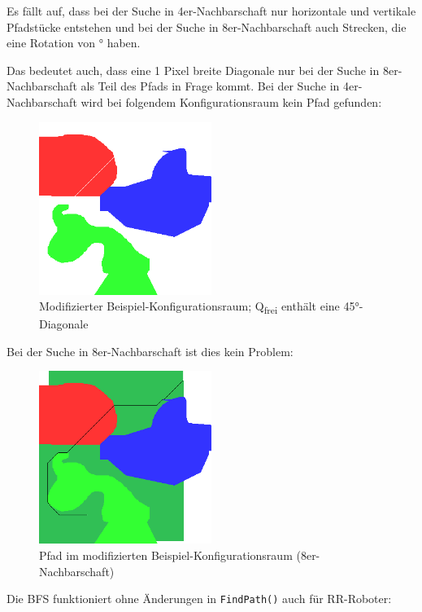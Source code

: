 \documentclass[11pt, a4paper]{article}
\newcommand{\code}{\texttt}
\begin{document}
Es fällt auf, dass bei der Suche in 4er-Nachbarschaft nur horizontale und vertikale Pfadstücke entstehen und bei der Suche in 8er-Nachbarschaft auch Strecken, die eine Rotation von ° haben.

Das bedeutet auch, dass eine 1 Pixel breite Diagonale nur bei der Suche in 8er-Nachbarschaft als Teil des Pfads in Frage kommt. Bei der Suche in 4er-Nachbarschaft wird bei folgendem Konfigurationsraum kein Pfad gefunden:

\begin{figure}[H]
	\center\includegraphics[width=0.5\textwidth,frame]{../Termin6/Termin6/cspace_1px.png}
	\caption{Modifizierter Beispiel-Konfigurationsraum;  Q\textsubscript{frei} enthält eine 45°-Diagonale}
\end{figure}

Bei der Suche in 8er-Nachbarschaft ist dies kein Problem:

\begin{figure}[H]
	\center\includegraphics[width=0.5\textwidth,frame]{../Termin6/Termin6/cspace_1px_bfs_8nb.png}
	\caption{Pfad im modifizierten Beispiel-Konfigurationsraum  (8er-Nachbarschaft)}
\end{figure}

Die BFS funktioniert ohne Änderungen in \code{FindPath()} auch für RR-Roboter:
\end{document}
